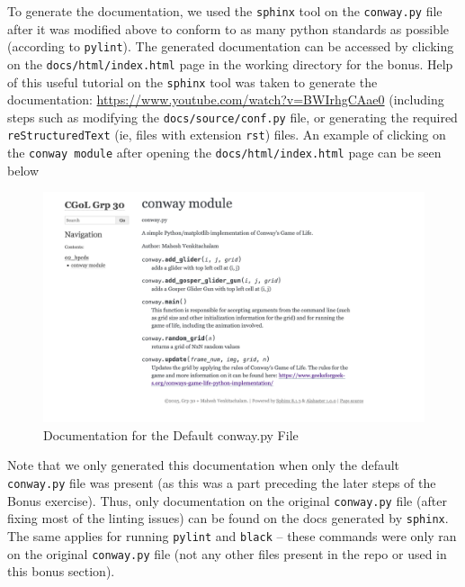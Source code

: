 \documentclass[a4paper,12pt]{article}
\begin{document}
To generate the documentation, we used the \verb|sphinx| tool on the \verb|conway.py| file after it was modified above to conform to as many python standards as possible (according to \verb|pylint|). The generated documentation can be accessed by clicking on the \verb|docs/html/index.html| page in the working directory for the bonus. Help of this useful tutorial on the \verb|sphinx| tool was taken to generate the documentation: \url{https://www.youtube.com/watch?v=BWIrhgCAae0} (including steps such as modifying the \verb|docs/source/conf.py| file, or generating the required \verb|reStructuredText| (ie, files with extension \verb|rst|) files. An example of clicking on the \verb|conway module| after opening the \verb|docs/html/index.html| page can be seen below

\begin{figure}[h!]
  \centering
  \includegraphics[width=\textwidth]{images/conway_documentation_example.png}
  \caption{Documentation for the Default conway.py File}
  \label{fig:conway_docs}
\end{figure}

Note that we only generated this documentation when only the default \verb|conway.py| file was present (as this was a part preceding the later steps of the Bonus exercise). Thus, only documentation on  the original \verb|conway.py| file (after fixing most of the linting issues) can be found on the docs generated by \verb|sphinx|. The same applies for running \verb|pylint| and \verb|black| -- these commands were only ran on the original \verb|conway.py| file (not any other files present in the repo or used in this bonus section).
\end{document}
